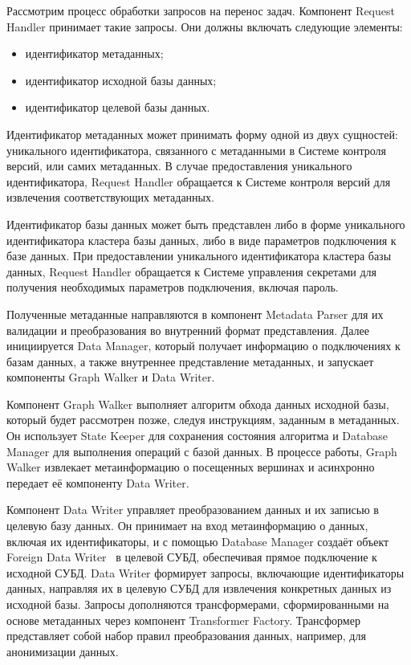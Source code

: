 Рассмотрим процесс обработки запросов на перенос задач. Компонент Request Handler принимает такие запросы. Они должны включать следующие элементы:

\begin{itemize}
  \item идентификатор метаданных;
  \item идентификатор исходной базы данных;
  \item идентификатор целевой базы данных.
\end{itemize}

Идентификатор метаданных может принимать форму одной из двух сущностей: уникального идентификатора, связанного с метаданными в Системе контроля версий, или самих метаданных. В случае предоставления уникального идентификатора, Request Handler обращается к Системе контроля версий для извлечения соответствующих метаданных.

Идентификатор базы данных может быть представлен либо в форме уникального идентификатора кластера базы данных, либо в виде параметров подключения к базе данных. При предоставлении уникального идентификатора кластера базы данных, Request Handler обращается к Системе управления секретами для получения необходимых параметров подключения, включая пароль.

Полученные метаданные направляются в компонент Metadata Parser для их валидации и преобразования во внутренний формат представления. Далее инициируется Data Manager, который получает информацию о подключениях к базам данных, а также внутреннее представление метаданных, и запускает компоненты Graph Walker и Data Writer.

Компонент Graph Walker выполняет алгоритм обхода данных исходной базы, который будет рассмотрен позже, следуя инструкциям, заданным в метаданных. Он использует State Keeper для сохранения состояния алгоритма и Database Manager для выполнения операций с базой данных. В процессе работы, Graph Walker извлекает метаинформацию о посещенных вершинах и асинхронно передает её компоненту Data Writer.

Компонент Data Writer управляет преобразованием данных и их записью в целевую базу данных. Он принимает на вход метаинформацию о данных, включая их идентификаторы, и с помощью Database Manager создаёт объект Foreign Data Writer~\cite{fdw} в целевой СУБД, обеспечивая прямое подключение к исходной СУБД. Data Writer формирует запросы, включающие идентификаторы данных, направляя их в целевую СУБД для извлечения конкретных данных из исходной базы. Запросы дополняются трансформерами, сформированными на основе метаданных через компонент Transformer Factory. Трансформер представляет собой набор правил преобразования данных, например, для анонимизации данных.

